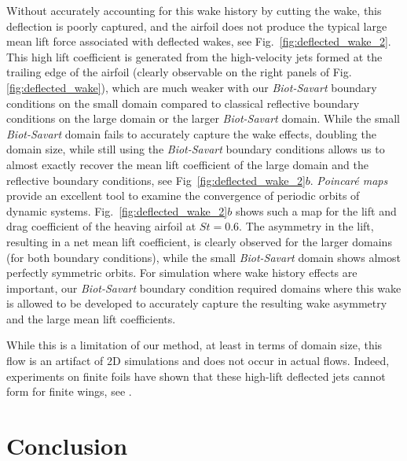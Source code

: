\documentclass[preprint,12pt]{elsarticle}
\begin{document}
Without accurately accounting for this wake history by cutting the wake, this deflection is poorly captured, and the airfoil does not produce the typical large mean lift force associated with deflected wakes, see Fig.~\ref{fig:deflected_wake_2}. This high lift coefficient is generated from the high-velocity jets formed at the trailing edge of the airfoil (clearly observable on the right panels of Fig.\ref{fig:deflected_wake}), which are much weaker with our \emph{Biot-Savart} boundary conditions on the small domain compared to classical reflective boundary conditions on the large domain or the larger \emph{Biot-Savart} domain. While the small \emph{Biot-Savart} domain fails to accurately capture the wake effects, doubling the domain size, while still using the \emph{Biot-Savart} boundary conditions allows us to almost exactly recover the mean lift coefficient of the large domain and the reflective boundary conditions, see Fig~\ref{fig:deflected_wake_2}$b$. \emph{Poincar\'e maps} provide an excellent tool to examine the convergence of periodic orbits of dynamic systems. Fig.~\ref{fig:deflected_wake_2}$b$ shows such a map for the lift and drag coefficient of the heaving airfoil at $St=0.6$. The asymmetry in the lift, resulting in a net mean lift coefficient, is clearly observed for the larger domains (for both boundary conditions), while the small \emph{Biot-Savart} domain shows almost perfectly symmetric orbits. For simulation where wake history effects are important, our \emph{Biot-Savart} boundary condition required domains where this wake is allowed to be developed to accurately capture the resulting wake asymmetry and the large mean lift coefficients. 

While this is a limitation of our method, at least in terms of domain size, this flow is an artifact of 2D simulations and does not occur in actual flows. Indeed, experiments on finite foils have shown that these high-lift deflected jets cannot form for finite wings, see \cite{Calderon2014OnWings, Godoy-DianaTransitionFoil}.

 
\section{Conclusion}
\end{document}
